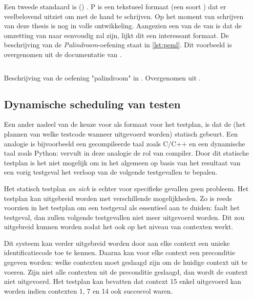 Een tweede standaard is  () \autocite{peml}.
P is een tekstueel formaat (een soort ) dat er veelbelovend uitziet om met de hand te schrijven.
Op het moment van schrijven van deze thesis is  nog in volle ontwikkeling.
Aangezien een van de  van  is dat de omzetting van  naar  eenvoudig zal zijn, lijkt dit een interessant formaat.
De beschrijving van de \emph{Palindroom}-oefening staat in \cref{lst:peml}.
Dit voorbeeld is overgenomen uit de documentatie van .

\begin{listing}
    \inputminted{yaml}{code/peml.peml}
    \caption{
        Beschrijving van de oefening "palindroom" in .
        Overgenomen uit \autocite{peml}.
    }
    \label{lst:peml}
\end{listing}


\subsection{Dynamische scheduling van testen}\label{subsec:dynamische-scheduling-van-testen}

Een ander nadeel van de keuze voor  als formaat voor het testplan, is dat de  (het plannen van welke testcode wanneer uitgevoerd worden) statisch gebeurt.
Een analogie is bijvoorbeeld een gecompileerde taal zoals C/C++ en een dynamische taal zoals Python: \tested{} vervult in deze analogie de rol van compiler.
Door dit statische testplan is het niet mogelijk om in het algemeen op basis van het resultaat van een vorig testgeval het verloop van de volgende testgevallen te bepalen.

Het statisch testplan \emph{an sich} is echter voor specifieke gevallen geen probleem.
Het testplan kan uitgebreid worden met verschillende mogelijkheden.
Zo is reeds voorzien in het testplan om een testgeval als essentieel aan te duiden: faalt het testgeval, dan zullen volgende testgevallen niet meer uitgevoerd worden.
Dit zou uitgebreid kunnen worden zodat het ook op het niveau van contexten werkt.

Dit systeem kan verder uitgebreid worden door aan elke context een unieke identificatiecode toe te kennen.
Daarna kan voor elke context een preconditie gegeven worden: welke contexten moet geslaagd zijn om de huidige context uit te voeren.
Zijn niet alle contexten uit de preconditie geslaagd, dan wordt de context niet uitgevoerd.
Het testplan kan bevatten dat context 15 enkel uitgevoerd kan worden indien contexten 1, 7 en 14 ook succesvol waren.

